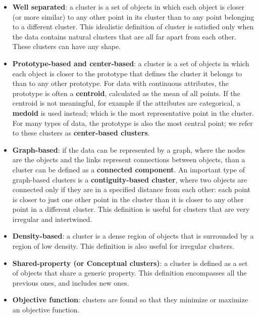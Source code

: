 \begin{itemize}
    \item \textbf{Well separated}: a cluster is a set of objects in which each object is closer (or more similar) to any other point in its cluster than to any point belonging to a different cluster. This idealistic definition of cluster is satisfied only when the data contains natural clusters that are all far apart from each other. These clusters can have any shape.

    \item \textbf{Prototype-based and center-based}: a cluster is a set of objects in which each object is closer to the prototype that defines the cluster it belongs to than to any other prototype. For data with continuous attributes, the prototype is often a \textbf{centroid}, calculated as the mean of all points. If the centroid is not meaningful, for example if the attributes are categorical, a \textbf{medoid} is used instead; which is the most representative point in the cluster. For many types of data, the prototype is also the most central point; we refer to these clusters as \textbf{center-based clusters}.

    \item \textbf{Graph-based}: if the data can be represented by a graph, where the nodes are the objects and the links represent connections between objects, than a cluster can be defined as a \textbf{connected component}. An important type of graph-based clusters is a \textbf{contiguity-based cluster}, where two objects are connected only if they are in a specified distance from each other: each point is closer to just one other point in the cluster than it is closer to any other point in a different cluster. This definition is useful for clusters that are very irregular and intertwined.
    
    \item \textbf{Density-based}: a cluster is a dense region of objects that is surrounded by a region of low density. This definition is also useful for irregular clusters.

    \item \textbf{Shared-property (or Conceptual clusters)}: a cluster is defined as a set of objects that share a generic property. This definition encompasses all the previous ones, and includes new ones.

    \item \textbf{Objective function}: clusters are found so that they minimize or maximize an objective function.
\end{itemize}

